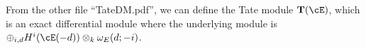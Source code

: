 \documentclass[12pt]{amsart}
\theoremstyle{definition}
\newtheorem{example}[lemma]{Example}
\theoremstyle{remark}
\newcommand{\Tate}{{\mathbf{T}}}
\newcommand{\cO}{{\mathcal O}}
\newcommand{\daniel}[1]{{\color{blue} \sf $\clubsuit\clubsuit\clubsuit$ Daniel: [#1]}}
\begin{document}
%
%

From the other file ``TateDM.pdf'', we can define the Tate module $\Tate(\cE)$, which is an exact differential module where the underlying module is $\oplus_{i,d} H^i(\cE(-d))\otimes_k \omega_E(d;-i)$.
\end{document}
